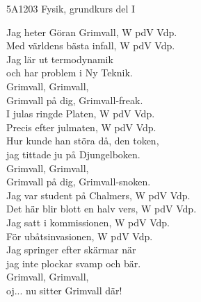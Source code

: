 \documentclass[a6paper, 10pt, twoside]{article}
\begin{document}
\noindent
\begin{center}
\footnotesize5A1203 Fysik, grundkurs del I\\
\end{center}
\begin{lyrics}
Jag heter Göran Grimvall, W pdV Vdp. \\
Med världens bästa infall, W pdV Vdp. \\
Jag lär ut termodynamik \\
och har problem i Ny Teknik. \\
Grimvall, Grimvall, \\
Grimvall på dig, Grimvall-freak. 
\vspace{5pt} \\
I julas ringde Platen, W pdV Vdp. \\
Precis efter julmaten, W pdV Vdp. \\
Hur kunde han störa då, den token, \\
jag tittade ju på Djungelboken. \\
Grimvall, Grimvall, \\
Grimvall på dig, Grimvall-snoken. 
\vspace{5pt} \\
Jag var student på Chalmers, W pdV Vdp. \\
Det här blir blott en halv vers, W pdV Vdp. 
\vspace{5pt} \\
Jag satt i kommissionen, W pdV Vdp. \\
För ubåtsinvasionen, W pdV Vdp. \\
Jag springer efter skärmar när \\
jag inte plockar svamp och bär. 
\vspace{5pt} \\
Grimvall, Grimvall,\\
 oj... nu sitter Grimvall där! 
\end{lyrics}
\end{document}
